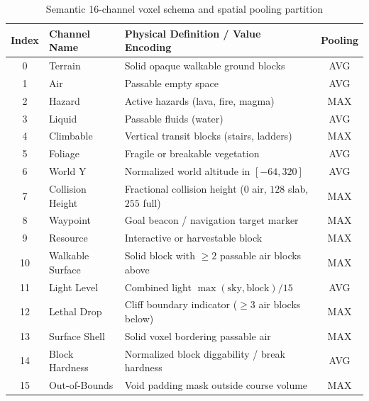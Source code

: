 \documentclass[runningheads]{llncs}
\begin{document}
\begin{table}[t]
\centering
\caption{Semantic 16-channel voxel schema and spatial pooling partition}
\label{tab:schema}
\begin{tabular}{c l l c}
\toprule
\textbf{Index} & \textbf{Channel Name} & \textbf{Physical Definition / Value Encoding} & \textbf{Pooling} \\
\midrule
0 & Terrain & Solid opaque walkable ground blocks & AVG \\
1 & Air & Passable empty space & AVG \\
2 & Hazard & Active hazards (lava, fire, magma) & MAX \\
3 & Liquid & Passable fluids (water) & AVG \\
4 & Climbable & Vertical transit blocks (stairs, ladders) & MAX \\
5 & Foliage & Fragile or breakable vegetation & AVG \\
6 & World Y & Normalized world altitude in $[-64, 320]$ & AVG \\
7 & Collision Height & Fractional collision height ($0$ air, $128$ slab, $255$ full) & MAX \\
8 & Waypoint & Goal beacon / navigation target marker & MAX \\
9 & Resource & Interactive or harvestable block & MAX \\
10 & Walkable Surface & Solid block with $\ge 2$ passable air blocks above & MAX \\
11 & Light Level & Combined light $\max(\text{sky}, \text{block}) / 15$ & AVG \\
12 & Lethal Drop & Cliff boundary indicator ($\ge 3$ air blocks below) & MAX \\
13 & Surface Shell & Solid voxel bordering passable air & MAX \\
14 & Block Hardness & Normalized block diggability / break hardness & AVG \\
15 & Out-of-Bounds & Void padding mask outside course volume & MAX \\
\bottomrule
\end{tabular}
\end{table}
\end{document}
